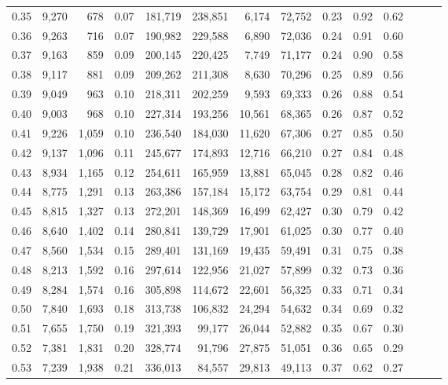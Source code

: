 \begin{tabular}{rrrrrrrrrrrrrr}
0.35 &  9,270 &    678 &  0.07 &  181,719 &  238,851 &   6,174 &  72,752 &  0.23 &  0.92 &      0.62 \\
0.36 &  9,263 &    716 &  0.07 &  190,982 &  229,588 &   6,890 &  72,036 &  0.24 &  0.91 &      0.60 \\
0.37 &  9,163 &    859 &  0.09 &  200,145 &  220,425 &   7,749 &  71,177 &  0.24 &  0.90 &      0.58 \\
0.38 &  9,117 &    881 &  0.09 &  209,262 &  211,308 &   8,630 &  70,296 &  0.25 &  0.89 &      0.56 \\
0.39 &  9,049 &    963 &  0.10 &  218,311 &  202,259 &   9,593 &  69,333 &  0.26 &  0.88 &      0.54 \\
0.40 &  9,003 &    968 &  0.10 &  227,314 &  193,256 &  10,561 &  68,365 &  0.26 &  0.87 &      0.52 \\
0.41 &  9,226 &  1,059 &  0.10 &  236,540 &  184,030 &  11,620 &  67,306 &  0.27 &  0.85 &      0.50 \\
0.42 &  9,137 &  1,096 &  0.11 &  245,677 &  174,893 &  12,716 &  66,210 &  0.27 &  0.84 &      0.48 \\
0.43 &  8,934 &  1,165 &  0.12 &  254,611 &  165,959 &  13,881 &  65,045 &  0.28 &  0.82 &      0.46 \\
0.44 &  8,775 &  1,291 &  0.13 &  263,386 &  157,184 &  15,172 &  63,754 &  0.29 &  0.81 &      0.44 \\
0.45 &  8,815 &  1,327 &  0.13 &  272,201 &  148,369 &  16,499 &  62,427 &  0.30 &  0.79 &      0.42 \\
0.46 &  8,640 &  1,402 &  0.14 &  280,841 &  139,729 &  17,901 &  61,025 &  0.30 &  0.77 &      0.40 \\
0.47 &  8,560 &  1,534 &  0.15 &  289,401 &  131,169 &  19,435 &  59,491 &  0.31 &  0.75 &      0.38 \\
0.48 &  8,213 &  1,592 &  0.16 &  297,614 &  122,956 &  21,027 &  57,899 &  0.32 &  0.73 &      0.36 \\
0.49 &  8,284 &  1,574 &  0.16 &  305,898 &  114,672 &  22,601 &  56,325 &  0.33 &  0.71 &      0.34 \\
0.50 &  7,840 &  1,693 &  0.18 &  313,738 &  106,832 &  24,294 &  54,632 &  0.34 &  0.69 &      0.32 \\
0.51 &  7,655 &  1,750 &  0.19 &  321,393 &   99,177 &  26,044 &  52,882 &  0.35 &  0.67 &      0.30 \\
0.52 &  7,381 &  1,831 &  0.20 &  328,774 &   91,796 &  27,875 &  51,051 &  0.36 &  0.65 &      0.29 \\
0.53 &  7,239 &  1,938 &  0.21 &  336,013 &   84,557 &  29,813 &  49,113 &  0.37 &  0.62 &      0.27 \\

\end{tabular}
